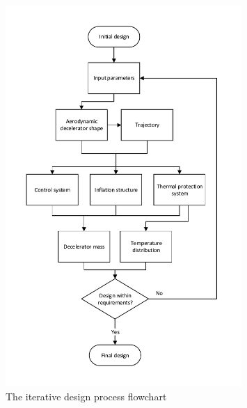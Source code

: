 \begin{figure}[h!]
		\vspace{-1cm}
		\includegraphics[width=0.8\textwidth]{./Figure/DesignIterationPhilosophy_new.pdf}
		
		\caption{The iterative design process flowchart}
		\label{fig:iterativedesignflowchart}
\end{figure}